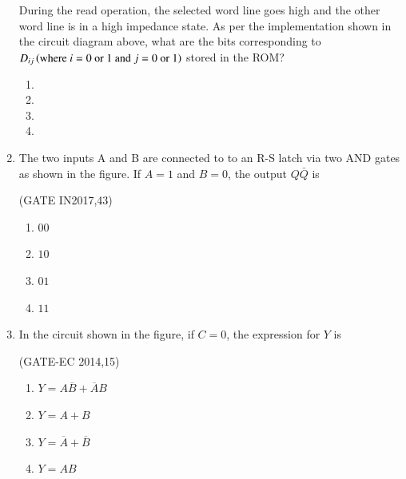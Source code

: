 \begin{enumerate}
	      During the read operation, the selected word line goes high and the other word line is in a high impedance state. As per the implementation shown in the circuit diagram above, what are the bits corresponding to $D_{ij}\left(\text{where $i=0$ or $1$ and $j=0$ or $1$}\right)$ stored in the ROM?
	      \begin{enumerate}
		      \item {}
		      \item {}
		      \item {}
		      \item {}
	      \end{enumerate}

	\item The two inputs A and B are connected to to an R-S latch via two AND gates as shown in the figure. If $A=1$ and $B=0$, the output $Q\bar{Q}$ is
	      \begin{figure}[H]
		      \centering
		      
	      \end{figure}
	      \hfill(GATE IN2017,43)
	      \begin{enumerate}
		      \item $00$
		      \item $10$
		      \item $01$
		      \item $11$

	      \end{enumerate}

	\item In the circuit shown in the figure, if $C = 0$, the expression for $Y$ is


	      \begin{figure}[H]
		      \centering
		      
		      \label{figure:}
	      \end{figure}
	      \hfill (GATE-EC 2014,15)
	      \begin{enumerate}
		      \item $Y= A\overline{B}+ \overline{A}B $
		      \item $Y=A+B$
		      \item $Y=\overline{A}+\overline{B}$
		      \item $Y=AB$


\end{enumerate}
\end{enumerate}

